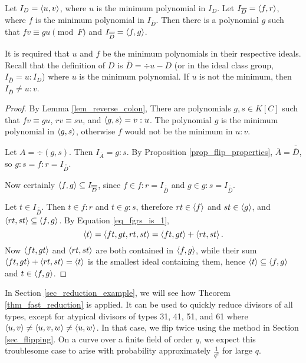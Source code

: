 \begin{theorem}
  \label{thm_fast_reduction}
  Let $I_D = \left\langle u,v \right\rangle$, where $u$ is the minimum polynomial in $I_D$.
  Let $I_{\overline D} = \left\langle f, r \right\rangle$, where $f$ is the minimum polynomial in $I_{\bar D}$.
  Then there is a polynomial $g$ such that $fv \equiv gu \pmod F$ and $I_{\overline{\overline D}} = \left\langle f,g \right\rangle$.
\end{theorem}
\begin{remark}
  It is required that $u$ and $f$ be the minimum polynomials in their respective ideals.
  Recall that the definition of $D$ is $\bar D = \div u - D$
  (or in the ideal class group, $I_{\bar D} = u : I_D$)
  where $u$ is the minimum polynomial.
  If $u$ is not the minimum, then $I_{\bar D} \neq u : v$.
\end{remark}
\begin{proof}
  By Lemma \ref{lem_reverse_colon},
  There are polynomials $g, s \in K[C]$ such that $fv \equiv gu$, $rv \equiv su$, and $\left\langle g,s \right\rangle = v : u$.
  The polynomial $g$ is the minimum polynomial in $\left\langle g,s \right\rangle$,
  otherwise $f$ would not be the minimum in $u : v$.
  
  Let $A = \div(g,s)$.
  Then $I_{\bar A} = g : s$.
  By Proposition \ref{prop_flip_properties}, $\bar A = \bar{\bar D}$,
  so $g : s = f : r = I_{\bar{\bar D}}$.
  
  Now certainly $\left\langle f,g \right\rangle \subseteq I_{\overline{\overline D}}$,
  since $f \in f : r = I_{\bar{\bar D}}$ and $g \in g : s = I_{\bar{\bar D}}$.
  
  Let $t \in I_{\bar{\bar D}}$.
  Then $t \in f : r$ and $t \in g : s$, therefore $rt \in \left\langle f \right\rangle$ and $st \in \left\langle g \right\rangle$,
  and $\left\langle rt, st \right\rangle \subseteq \left\langle f,g \right\rangle$.
  By Equation \ref{eq_fgrs_is_1},
  \[ \left\langle t \right\rangle = \left\langle ft,gt,rt,st \right\rangle = \left\langle ft,gt \right\rangle + \left\langle rt,st \right\rangle. \]
  Now $\left\langle ft,gt \right\rangle$ and $\left\langle rt,st \right\rangle$ are both contained in $\left\langle f, g \right\rangle$,
  while their sum $\left\langle ft,gt \right\rangle + \left\langle rt,st \right\rangle = \left\langle t \right\rangle$ is the smallest ideal containing them,
  hence $\left\langle t \right\rangle \subseteq \left\langle f,g \right\rangle$ and $t \in \left\langle f,g \right\rangle$.
\end{proof}

In Section \ref{sec_reduction_example}, we will see how Theorem \ref{thm_fast_reduction} is applied.
It can be used to quickly reduce divisors of all types, except for atypical divisors of types 31, 41, 51, and 61
where $\left\langle u,v \right\rangle \neq \left\langle u,v,w \right\rangle \neq \left\langle u,w \right\rangle$.
In that case, we flip twice using the method in Section \ref{sec_flipping}.
On a curve over a finite field of order $q$,
we expect this troublesome case to arise with probability approximately $\frac 1 {q^2}$ for large $q$.



